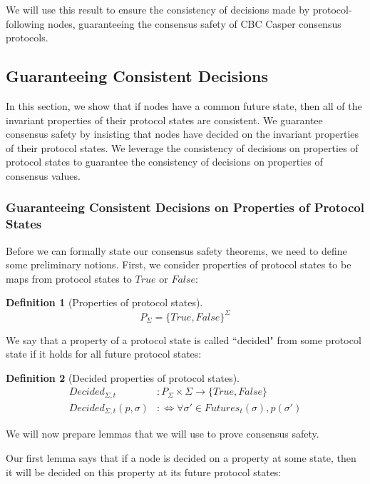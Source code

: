 \documentclass{article}
\theoremstyle{definition}
\newtheorem{defn}{Definition}[section]
\begin{document}
We will use this result to ensure the consistency of decisions made by protocol-following nodes, guaranteeing the consensus safety of CBC Casper consensus protocols.

\subsection{Guaranteeing Consistent Decisions}

In this section, we show that if nodes have a common future state, then all of the invariant properties of their protocol states are consistent. We guarantee consensus safety by insisting that nodes have decided on the invariant properties of their protocol states. We leverage the consistency of decisions on properties of protocol states to guarantee the consistency of decisions on properties of consensus values.

\subsubsection{Guaranteeing Consistent Decisions on Properties of Protocol States}

Before we can formally state our consensus safety theorems, we need to define some preliminary notions. First, we consider properties of protocol states to be maps from protocol states to $True$ or $False$:

\begin{defn}[Properties of protocol states]
$$
P_\Sigma = \{True, False\}^\Sigma  %
$$
\end{defn}

We say that a property of a protocol state is called ``decided" from some protocol state if it holds for all future protocol states:

\begin{defn}[Decided properties of protocol states]
\begin{align}
Decided_{\Sigma, t}&: P_\Sigma \times \Sigma \to \{True,False\} \\
Decided_{\Sigma, t}(p, \sigma) &:\Leftrightarrow \forall \sigma' \in Futures_t(\sigma), p(\sigma')
\end{align}
\end{defn}

We will now prepare lemmas that we will use to prove consensus safety.

Our first lemma says that if a node is decided on a property at some state, then it will be decided on this property at its future protocol states:
\end{document}
